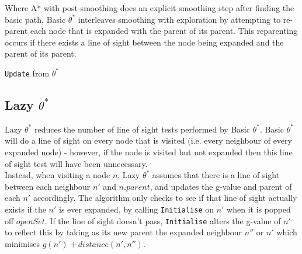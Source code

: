 \documentclass[12pt,twoside,notitlepage]{report}
\begin{document}
Where A* with post-smoothing does an explicit smoothing step after finding the basic path, Basic {$\theta^{*}$} interleaves smoothing with exploration by attempting to re-parent each node that is expanded with the parent of its parent. This reparenting occurs if there exists a line of sight between the node being expanded and the parent of its parent.\\

\begin{algorithm}[htp]
  \SetAlgoLined\DontPrintSemicolon
  \caption{{\tt Update} from {\sc $\theta^{*}$}}
\end{algorithm} 

\subsection {Lazy {$\theta^{*}$}}

Lazy {$\theta^{*}$} reduces the number of line of sight tests performed by Basic {$\theta^{*}$}. Basic {$\theta^{*}$} will do a line of sight on every node that is visited (i.e. every neighbour of every expanded node) - however, if the node is visited but not expanded then this line of sight test will have been unnecessary.\\

\noindent
Instead, when visiting a node $n$, Lazy {$\theta^{*}$} assumes that there is a line of sight between each neighbour $n'$ and $n.parent$, and updates the g-value and parent of each $n'$ accordingly. The algorithm only checks to see if that line of sight actually exists if the $n'$ is ever expanded, by calling {\tt Initialise} on $n'$ when it is popped off $openSet$. If the line of sight doesn't pass, {\tt Initialise} alters the g-value of $n'$ to reflect this by taking as its new parent the expanded neighbour $n''$ or $n'$ which minimises {$g(n') + distance(n',n'')$}.
\end{document}
